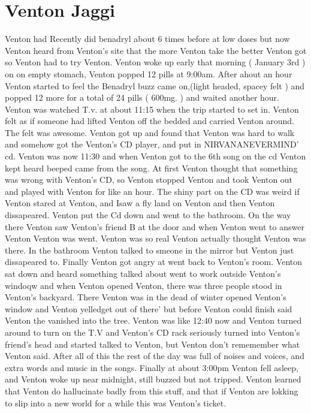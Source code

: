 \documentclass[12pt]{book}
\begin{document}
\chapter{Venton Jaggi}

Venton had Recently did benadryl about 6 times before at low doses but now Venton heard from Venton's site that the more Venton take the better Venton got so Venton had to try Venton. Venton woke up early that morning ( January 3rd ) on on empty stomach, Venton popped 12 pills at 9:00am. After ahout an hour Venton started to feel the Benadryl buzz came on,(light headed, spacey felt ) and popped 12 more for a total of 24 pills ( 600mg. ) and waited another hour. Venton was watched T.v. at about 11:15 when the trip started to set in. Venton felt as if someone had lifted Venton off the bedded and carried Venton around. The felt was awesome. Venton got up and found that Venton was hard to walk and somehow got the Venton's CD player, and put in NIRVANANEVERMIND' cd. Venton was now 11:30 and when Venton got to the 6th song on the cd Venton kept heard beeped came from the song. At first Venton thought that something was wrong with Venton's CD, so Venton stopped Venton and took Venton out and played with Venton for like an hour. The shiny part on the CD was weird if Venton stared at Venton, and Isaw a fly land on Venton and then Venton dissapeared. Venton put the Cd down and went to the bathroom. On the way there Venton saw Venton's friend B at the door and when Venton went to answer Venton Venton was went. Venton was so real Venton actually thought Venton was there. In the bathroom Venton talked to smeone in the mirror but Venton just dissapeared to. Finally Venton got angry at went back to Venton's room. Venton sat down and heard something talked about went to work outside Venton's windoqw and when Venton opened Venton, there was three people stood in Venton's backyard. There Venton was in the dead of winter opened Venton's window and Venton yelledget out of there' but before Venton could finish said Venton the vanished into the tree. Venton was like 12:40 now and Venton turned around to turn on the T.V and Venton's CD rack seriously turned into Venton's friend's head and started talked to Venton, but Venton don't rememember what Venton said. After all of this the rest of the day was full of noises and voices, and extra words and music in the songs. Finally at about 3:00pm Venton fell asleep, and Venton woke up near midnight, still buzzed but not tripped. Venton learned that Venton do hallucinate badly from this stuff, and that if Venton are lokking to slip into a new world for a while this was Venton's ticket.
\end{document}
